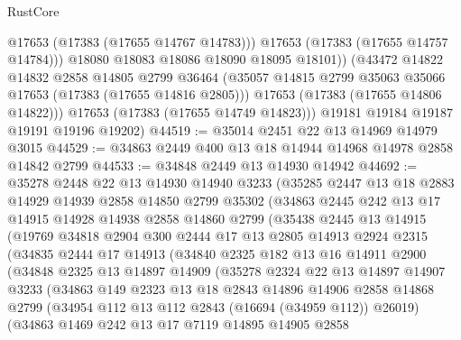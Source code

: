 \begin{lexlean}{RustCore}
\begin{coremodule}
                @17653
                (@17383 (@17655 @14767 @14783)))
              @17653
              (@17383 (@17655 @14757 @14784)))
            @18080
            @18083
            @18086
            @18090
            @18095
            @18101))
        (@43472
          @14822
          @14832
          @2858
          @14805
          @2799
          @36464
          (@35057 @14815 @2799 @35063 @35066 @17653 (@17383 (@17655 @14816 @2805)))
          @17653
          (@17383 (@17655 @14806 @14822)))
        @17653
        (@17383 (@17655 @14749 @14823)))
      @19181
      @19184
      @19187
      @19191
      @19196
      @19202)
@44519 := @35014 @2451 @22 @13 @14969 @14979 @3015
@44529 := @34863 @2449 @400 @13 @18 @14944 @14968 @14978 @2858 @14842 @2799
@44533 := @34848 @2449 @13 @14930 @14942
@44692 := @35278
    @2448
    @22
    @13
    @14930
    @14940
    @3233
    (@35285
      @2447
      @13
      @18
      @2883
      @14929
      @14939
      @2858
      @14850
      @2799
      @35302
      (@34863
        @2445
        @242
        @13
        @17
        @14915
        @14928
        @14938
        @2858
        @14860
        @2799
        (@35438
          @2445
          @13
          @14915
          (@19769
            @34818
            @2904
            @300
            @2444
            @17
            @13
            @2805
            @14913
            @2924
            @2315
            (@34835
              @2444
              @17
              @14913
              (@34840
                @2325
                @182
                @13
                @16
                @14911
                @2900
                (@34848
                  @2325
                  @13
                  @14897
                  @14909
                  (@35278
                    @2324
                    @22
                    @13
                    @14897
                    @14907
                    @3233
                    (@34863
                      @149
                      @2323
                      @13
                      @18
                      @2843
                      @14896
                      @14906
                      @2858
                      @14868
                      @2799
                      (@34954 @112 @13 @112 @2843 (@16694 (@34959 @112)) @26019)
                      (@34863
                        @1469
                        @242
                        @13
                        @17
                        @7119
                        @14895
                        @14905
                        @2858

\end{coremodule}
\end{lexlean}
